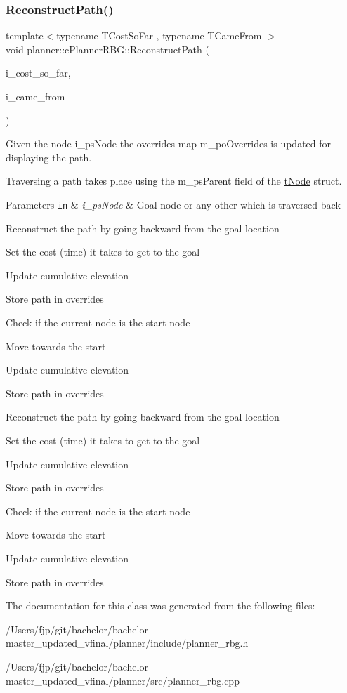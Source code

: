 \subsubsection{\texorpdfstring{Reconstruct\+Path()}{ReconstructPath()}\hspace{0.1cm}{\footnotesize\ttfamily [2/2]}}
{\footnotesize\ttfamily template$<$typename T\+Cost\+So\+Far , typename T\+Came\+From $>$ \\
void planner\+::c\+Planner\+R\+B\+G\+::\+Reconstruct\+Path (\begin{DoxyParamCaption}\item[{T\+Cost\+So\+Far \&\&}]{i\+\_\+cost\+\_\+so\+\_\+far,  }\item[{T\+Came\+From \&\&}]{i\+\_\+came\+\_\+from }\end{DoxyParamCaption})}



Given the node i\+\_\+ps\+Node the overrides map m\+\_\+po\+Overrides is updated for displaying the path. 

Traversing a path takes place using the m\+\_\+ps\+Parent field of the \mbox{\hyperlink{structplanner_1_1t_node}{t\+Node}} struct. 
\begin{DoxyParams}[1]{Parameters}
\mbox{\tt in}  & {\em i\+\_\+ps\+Node} & Goal node or any other which is traversed back \\
\hline
\end{DoxyParams}
Reconstruct the path by going backward from the goal location

Set the cost (time) it takes to get to the goal

Update cumulative elevation

Store path in overrides

Check if the current node is the start node

Move towards the start

Update cumulative elevation

Store path in overrides

Reconstruct the path by going backward from the goal location

Set the cost (time) it takes to get to the goal

Update cumulative elevation

Store path in overrides

Check if the current node is the start node

Move towards the start

Update cumulative elevation

Store path in overrides 

The documentation for this class was generated from the following files\+:\begin{DoxyCompactItemize}
\item 
/\+Users/fjp/git/bachelor/bachelor-\/master\+\_\+updated\+\_\+vfinal/planner/include/planner\+\_\+rbg.\+h\item 
/\+Users/fjp/git/bachelor/bachelor-\/master\+\_\+updated\+\_\+vfinal/planner/src/planner\+\_\+rbg.\+cpp\end{DoxyCompactItemize}
